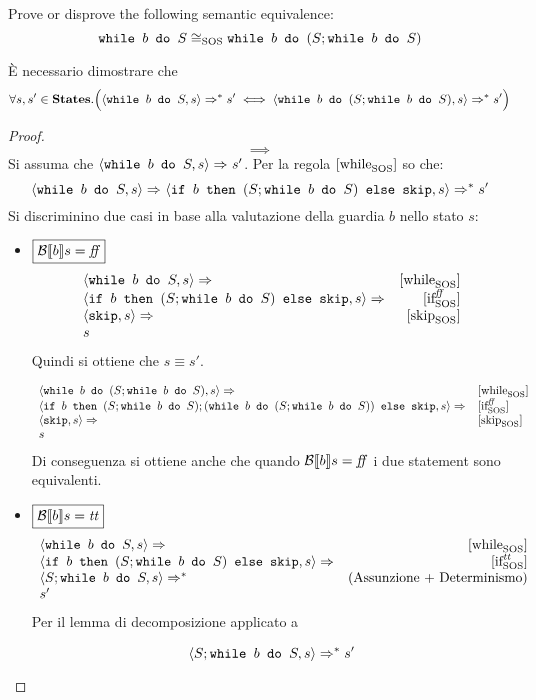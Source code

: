 {Prove or disprove the following semantic equivalence:
$$
\wbS{b}{S} \eqSOS \wbS{b}{(S;\wbS{b}{S})}
$$
}
{
È necessario dimostrare che
$$
\forall s,s' \in \states. \Big(\confSs{\wbS{b}{S}}{s} \Rar{*} s' \iff \confSs{\wbS{b}{(S;\wbS{b}{S})}}{s} \Rar{*} s' \Big)
$$
\begin{proof}
$$
\boxed{\implies}
$$
Si assuma che $\confSs{\wbS{b}{S}}{s} \Rar{ } s'$.
Per la regola $\whileSOS$ so che:
$$
\confSs{\wbS{b}{S}}{s} \Rar{ } \confSs{\ifABC{b}{(S; \wbS{b}{S})}{\skipForFriends}}{s} \Rar{*} s'
$$
Si discriminino due casi in base alla valutazione della guardia $b$ nello
stato $s$:
\begin{itemize}
	\item $\boxed{\B{b} = \semfalse}$
	$$
	\begin{array}{lr}
	\confSs{\wbS{b}{S}}{s} \Rar{ } & \whileSOS \\
	\confSs{\ifABC{b}{(S; \wbS{b}{S})}{\skipForFriends}}{s} \Rar{ }& \ifffSOS \\
	\confSs{\skipForFriends}{s} \Rar{} & \skipSOS\\
	s
	\end{array}
	$$
	Quindi si ottiene che $s \equiv{} s'$.
	
	$$
	\begin{array}{ll}
	\confSs{\wbS{b}{(S;\wbS{b}{S})}}{s} \Rar{ } & \whileSOS\\	
	\confSs{\ifABC{b}{(S; \wbS{b}{S}); (\wbS{b}{(S;\wbS{b}{S})})}{\skipForFriends}}{s} \Rar{ } & \ifffSOS \\
	\confSs{\skipForFriends}{s} \Rar{ } & \skipSOS\\
	s
	\end{array}
	$$
	Di conseguenza si ottiene anche che quando $\B{b} = \semfalse$ i due
	statement sono equivalenti.
	
	\item $\boxed{\B{b} = \semtrue}$
	$$
	\begin{array}{lr}
	\confSs{\wbS{b}{S}}{s} \Rar{ }  & \whileSOS \\
	\confSs{\ifABC{b}{(S;\wbS{b}{S})}{\skipForFriends}}{s} \Rar{ } & \ifttSOS\\
	\confSs{S; \wbS{b}{S}}{s} \Rar{*} & (\text{Assunzione + Determinismo})\\
	s'
	\end{array}
	$$
	Per il lemma di decomposizione applicato a
	
	\begin{equation}
	\confSs{S; \wbS{b}{S}}{s} \Rar{*} s'
		\label{eq:hw7:imp}
	\end{equation}


\end{itemize}
\end{proof}}
